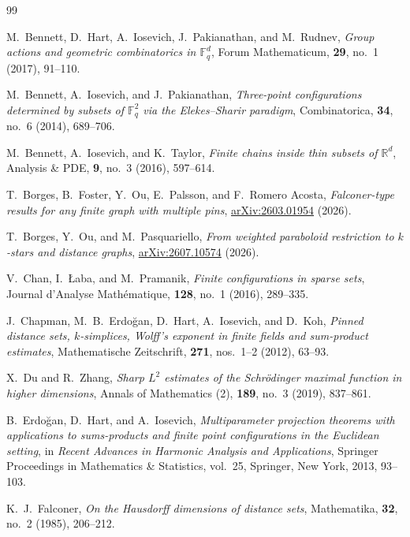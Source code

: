 \documentclass[11pt]{article}
\theoremstyle{remark}
\newcommand{\R}{\mathbb R}
\numberwithin{equation}{section}
\newcommand{\Fq}{\mathbb F_q}
\newcommand{\1}{\mathbf 1}
\begin{document}
\small
\begin{thebibliography}{99}


M.~Bennett, D.~Hart, A.~Iosevich, J.~Pakianathan, and M.~Rudnev,
\emph{Group actions and geometric combinatorics in \(\Fq^d\)},
Forum Mathematicum, \textbf{29}, no.~1 (2017), 91--110.

M.~Bennett, A.~Iosevich, and J.~Pakianathan,
\emph{Three-point configurations determined by subsets of \(\Fq^2\) via
the Elekes--Sharir paradigm},
Combinatorica, \textbf{34}, no.~6 (2014), 689--706.

M.~Bennett, A.~Iosevich, and K.~Taylor,
\emph{Finite chains inside thin subsets of \(\R^d\)},
Analysis \& PDE, \textbf{9}, no.~3 (2016), 597--614.

T.~Borges, B.~Foster, Y.~Ou, E.~Palsson, and F.~Romero Acosta,
\emph{Falconer-type results for any finite graph with multiple pins},
\href{https://arxiv.org/abs/2603.01954}{arXiv:2603.01954} (2026).

T.~Borges, Y.~Ou, and M.~Pasquariello,
\emph{From weighted paraboloid restriction to \(k\)-stars and distance
graphs},
\href{https://arxiv.org/abs/2607.10574}{arXiv:2607.10574} (2026).

V.~Chan, I.~{\L}aba, and M.~Pramanik,
\emph{Finite configurations in sparse sets},
Journal d'Analyse Math\'ematique, \textbf{128}, no.~1 (2016), 289--335.

J.~Chapman, M.~B.~Erdo\u{g}an, D.~Hart, A.~Iosevich, and D.~Koh,
\emph{Pinned distance sets, \(k\)-simplices, Wolff's exponent in finite
fields and sum-product estimates},
Mathematische Zeitschrift, \textbf{271}, nos.~1--2 (2012), 63--93.

X.~Du and R.~Zhang,
\emph{Sharp \(L^2\) estimates of the Schr\"odinger maximal function in
higher dimensions},
Annals of Mathematics (2), \textbf{189}, no.~3 (2019), 837--861.

B.~Erdo\u{g}an, D.~Hart, and A.~Iosevich,
\emph{Multiparameter projection theorems with applications to
sums-products and finite point configurations in the Euclidean
setting},
in \emph{Recent Advances in Harmonic Analysis and Applications},
Springer Proceedings in Mathematics \& Statistics, vol.~25,
Springer, New York, 2013, 93--103.

K.~J.~Falconer,
\emph{On the Hausdorff dimensions of distance sets},
Mathematika, \textbf{32}, no.~2 (1985), 206--212.


\end{thebibliography}
\end{document}

